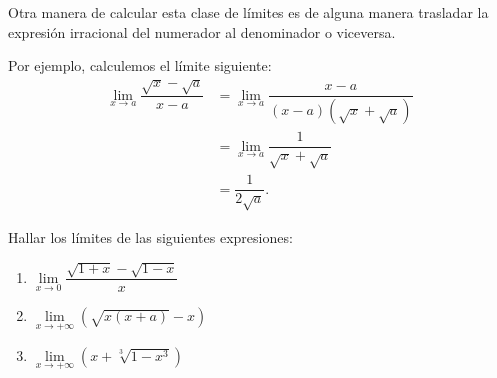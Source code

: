   Otra manera de calcular esta clase de l\'imites es de alguna manera trasladar la expresi\'on irracional del numerador al denominador o viceversa.\newline
  
  Por ejemplo, calculemos el l\'imite siguiente:
  \begin{align*}
  \lim\limits_{x\to a}\dfrac{\sqrt{x}-\sqrt{a}}{x-a}&=\lim\limits_{x\to a}\dfrac{x-a}{(x-a)\left(\sqrt{x}+\sqrt{a}\right)}\\
  &=\lim\limits_{x\to a}\dfrac{1}{\sqrt{x}+\sqrt{a}}\\
  &=\dfrac{1}{2\sqrt{a}}.
  \end{align*}
  
 \begin{exercise}
 	Hallar los l\'imites de las siguientes expresiones:
 	\begin{enumerate}
 		\item \(\lim\limits_{x\to 0}\dfrac{\sqrt{1+x}-\sqrt{1-x}}{x}\)
 		\item \(\lim\limits_{x\to+\infty}\left(\sqrt{x(x+a)}-x\right)\)
 		\item \(\lim\limits_{x\to+\infty}\left(x+\sqrt[3]{1-x^3}\right)\)
 	\end{enumerate}
 \end{exercise} 
